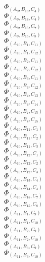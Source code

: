 \documentclass[14pt]{article}
\begin{document}
    $\Phi_{({A}_{9}, {B}_{13}, {C}_{4})}$ \\ 
    $\Phi_{({A}_{9}, {B}_{14}, {C}_{4})}$ \\ 
    $\Phi_{({A}_{9}, {B}_{15}, {C}_{7})}$ \\ 
    $\Phi_{({A}_{9}, {B}_{15}, {C}_{8})}$ \\ 
    $\Phi_{({A}_{10}, {B}_{1}, {C}_{11})}$ \\ 
    $\Phi_{({A}_{10}, {B}_{1}, {C}_{12})}$ \\ 
    $\Phi_{({A}_{10}, {B}_{2}, {C}_{11})}$ \\ 
    $\Phi_{({A}_{10}, {B}_{2}, {C}_{12})}$ \\ 
    $\Phi_{({A}_{10}, {B}_{3}, {C}_{11})}$ \\ 
    $\Phi_{({A}_{10}, {B}_{3}, {C}_{12})}$ \\ 
    $\Phi_{({A}_{10}, {B}_{4}, {C}_{13})}$ \\ 
    $\Phi_{({A}_{10}, {B}_{4}, {C}_{14})}$ \\ 
    $\Phi_{({A}_{10}, {B}_{7}, {C}_{15})}$ \\ 
    $\Phi_{({A}_{10}, {B}_{8}, {C}_{15})}$ \\ 
    $\Phi_{({A}_{10}, {B}_{11}, {C}_{1})}$ \\ 
    $\Phi_{({A}_{10}, {B}_{11}, {C}_{2})}$ \\ 
    $\Phi_{({A}_{10}, {B}_{11}, {C}_{3})}$ \\ 
    $\Phi_{({A}_{10}, {B}_{12}, {C}_{1})}$ \\ 
    $\Phi_{({A}_{10}, {B}_{12}, {C}_{2})}$ \\ 
    $\Phi_{({A}_{10}, {B}_{12}, {C}_{3})}$ \\ 
    $\Phi_{({A}_{10}, {B}_{13}, {C}_{4})}$ \\ 
    $\Phi_{({A}_{10}, {B}_{14}, {C}_{4})}$ \\ 
    $\Phi_{({A}_{10}, {B}_{15}, {C}_{7})}$ \\ 
    $\Phi_{({A}_{10}, {B}_{15}, {C}_{8})}$ \\ 
    $\Phi_{({A}_{11}, {B}_{1}, {C}_{9})}$ \\ 
    $\Phi_{({A}_{11}, {B}_{1}, {C}_{10})}$ \\ 
    $\Phi_{({A}_{11}, {B}_{2}, {C}_{9})}$ \\ 
    $\Phi_{({A}_{11}, {B}_{2}, {C}_{10})}$ \\ 
    $\Phi_{({A}_{11}, {B}_{3}, {C}_{9})}$ \\ 
    $\Phi_{({A}_{11}, {B}_{3}, {C}_{10})}$ \\ 
\end{document}
